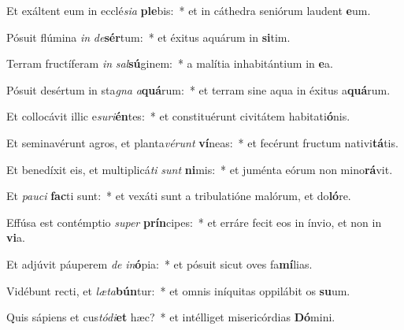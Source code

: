 \item Et exáltent eum in ecclé\textit{si}\textit{a} \textbf{ple}bis:~* et in cáthedra seniórum laudent \textbf{e}um.
\item Pósuit flúmina \textit{in} \textit{de}\textbf{sér}tum:~* et éxitus aquárum in \textbf{si}tim.
\item Terram fructíferam \textit{in} \textit{sal}\textbf{sú}ginem:~* a malítia inhabitántium in \textbf{e}a.
\item Pósuit desértum in sta\textit{gna} \textit{a}\textbf{quá}rum:~* et terram sine aqua in éxitus a\textbf{quá}rum.
\item Et collocávit illic e\textit{su}\textit{ri}\textbf{én}tes:~* et constituérunt civitátem habitati\textbf{ó}nis.
\item Et seminavérunt agros, et planta\textit{vé}\textit{runt} \textbf{ví}neas:~* et fecérunt fructum nativi\textbf{tá}tis.
\item Et benedíxit eis, et multiplicá\textit{ti} \textit{sunt} \textbf{ni}mis:~* et juménta eórum non mino\textbf{rá}vit.
\item Et \textit{pau}\textit{ci} \textbf{fac}ti sunt:~* et vexáti sunt a tribulatióne malórum, et do\textbf{ló}re.
\item Effúsa est contémptio \textit{su}\textit{per} \textbf{prín}cipes:~* et erráre fecit eos in ínvio, et non in \textbf{vi}a.
\item Et adjúvit páuperem \textit{de} \textit{in}\textbf{ó}pia:~* et pósuit sicut oves fa\textbf{mí}lias.
\item Vidébunt recti, et \textit{læ}\textit{ta}\textbf{bún}tur:~* et omnis iníquitas oppilábit os \textbf{su}um.
\item Quis sápiens et cus\textit{tó}\textit{di}\textbf{et} hæc?~* et intélliget misericórdias \textbf{Dó}mini.
